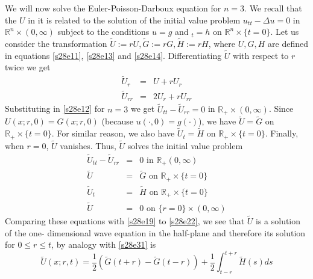 \documentclass{article}
\theoremstyle{plain}
\numberwithin{thm}{section}
\theoremstyle{plain}
\numberwithin{prop}{section}
\theoremstyle{definition}
\numberwithin{defn}{section}
\theoremstyle{remark}
\numberwithin{equation}{section}
\begin{document}
We will now solve the Euler-Poisson-Darboux equation for $n=3$. We recall that the $U$ in it is related to the 
solution of the initial value problem $u_{tt} - \Delta u = 0$ in $\mathbb{R}^n \times (0, \infty)$ subject to the 
conditions $u = g$ and $_t = h$ on $\mathbb{R}^n \times \{t=0\}$. Let us consider the transformation $\tilde{U} := 
rU, \tilde{G} := rG, \tilde{H} := rH$, where $U, G, H$ are defined in equations \eqref{s28e11}, \eqref{s28e13} and 
\eqref{s28e14}. Differentiating $\tilde{U}$ with respect to $r$ twice we get
\begin{eqnarray*}
\tilde{U}_r &=& U + rU_r \\
\tilde{U}_{rr} &=& 2U_r + rU_{rr}
\end{eqnarray*}
Substituting in \eqref{s28e12} for $n=3$ we get $\tilde{U}_{tt} - \tilde{U}_{rr} = 0$ in $\mathbb{R}_+ \times 
(0, \infty)$. Since $U(x; r, 0) = G(x; r, 0)$ (because $u(\cdot, 0) = g(\cdot)$), we have $\tilde{U} = \tilde{G}$ 
on $\mathbb{R}_+ \times \{t=0\}$. For similar reason, we also have $\tilde{U}_t = \tilde{H}$ on $\mathbb{R}_+ 
\times\{t=0\}$. Finally, when $r = 0$, $\tilde{U}$ vanishes. Thus, $\tilde{U}$ solves the initial value problem
\begin{eqnarray*}
\tilde{U}_{tt} - \tilde{U}_{rr} &=& 0 \text{ in } \mathbb{R}_+ (0, \infty) \\
\tilde{U} &=& \tilde{G} \text{ on } \mathbb{R}_+ \times \{t=0\} \\
\tilde{U}_t &=& \tilde{H} \text{ on } \mathbb{R}_+ \times \{t=0\} \\
\tilde{U} &=& 0 \text{ on } \{r = 0\} \times (0, \infty)
\end{eqnarray*}
Comparing these equations with \eqref{s28e19} to \eqref{s28e22}, we see that $\tilde{U}$ is a solution of the one-
dimensional wave equation in the half-plane and therefore its solution for $0 \le r \le t$, by analogy with 
\eqref{s28e31} is
\begin{equation}\label{s28e32}
\tilde{U}(x; r, t) = \frac{1}{2}(\tilde{G}(t+r)-\tilde{G}(t-r)) + \frac{1}{2}\int_{t-r}^{t+r}\tilde{H}(s)ds
\end{equation}
\end{document}
